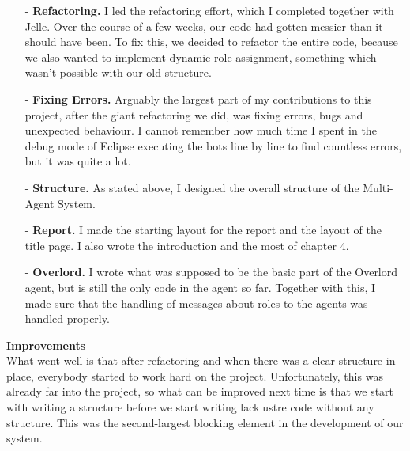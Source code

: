 \begin{itemize}
\item[-] \textbf{Refactoring.} I led the refactoring effort, which I completed together with Jelle. Over the course of a few weeks, our code had gotten messier than it should have been. To fix this, we decided to refactor the entire code, because we also wanted to implement dynamic role assignment, something which wasn't possible with our old structure.
\item[-] \textbf{Fixing Errors.} Arguably the largest part of my contributions to this project, after the giant refactoring we did, was fixing errors, bugs and unexpected behaviour. I cannot remember how much time I spent in the debug mode of Eclipse executing the bots line by line to find countless errors, but it was quite a lot.
\item[-] \textbf{Structure.} As stated above, I designed the overall structure of the Multi-Agent System.
\item[-] \textbf{Report.} I made the starting layout for the report and the layout of the title page. I also wrote the introduction and the most of chapter 4.
\item[-] \textbf{Overlord.} I wrote what was supposed to be the basic part of the Overlord agent, but is still the only code in the agent so far. Together with this, I made sure that the handling of messages about roles to the agents was handled properly.
\end{itemize}
\noindent
\textbf{Improvements}\\
What went well is that after refactoring and when there was a clear structure in place, everybody started to work hard on the project. Unfortunately, this was already far into the project, so what can be improved next time is that we start with writing a structure before we start writing lacklustre code without any structure. This was the second-largest blocking element in the development of our system.

